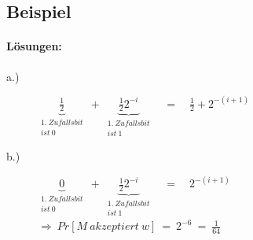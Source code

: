 \subsection{Beispiel}
\label{PTM_Example1}


\paragraph{Lösungen:}
\begin{description}
	\item [a.)] $\underbrace{\frac{1}{2}}_{\substack{1.\ Zufallsbit \\ ist\ 0}}\ +\ \underbrace{\frac{1}{2}2^{-i}}_{\substack{1.\ Zufallsbit \\ ist\ 1}} \quad = \quad \frac{1}{2} + 2^{-(i+1)}$
	\item [b.)] $\underbrace{0}_{\substack{1.\ Zufallsbit \\ ist\ 0}}\ +\ \underbrace{\frac{1}{2}2^{-i}}_{\substack{1.\ Zufallsbit \\ ist\ 1}} \quad = \quad 2^{-(i+1)}$ \\ $\Rightarrow\ Pr[M\ akzeptiert\ w]\ =\ 2^{-6}\ =\ \frac{1}{64}$
\end{description}




